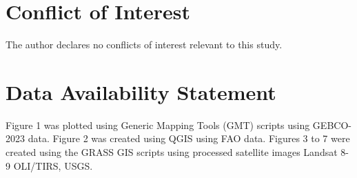 \documentclass[draft]{agujournal2019}
\begin{document}
\section*{Conflict of Interest}
The author declares no conflicts of interest relevant to this study.

\section*{Data Availability Statement}
Figure 1 was plotted using Generic Mapping Tools (GMT) scripts using GEBCO-2023 data. Figure 2 was created using QGIS using FAO data. Figures 3 to 7 were created using the GRASS GIS scripts using processed satellite images Landsat 8-9 OLI/TIRS, USGS. 

%



%



%
%
%
%
%
\end{document}
